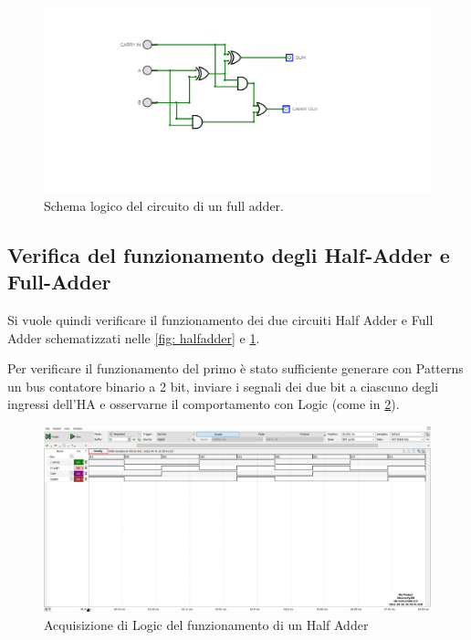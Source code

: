 \documentclass[10pt, a4paper, italian]{article}
\begin{document}
\begin{figure}[htbp]
    \centering
    \includegraphics[width=0.6\linewidth]{full}
    \caption{Schema logico del circuito di un full adder.
    \label{fig: fulladder}}
\end{figure}

\subsection{Verifica del funzionamento degli Half-Adder e Full-Adder}
Si vuole quindi verificare il funzionamento dei due circuiti Half Adder e
Full Adder schematizzati nelle \cref{fig: halfadder} e \cref{fig: fulladder}.

Per verificare il funzionamento del primo è stato sufficiente generare con
Patterns un bus contatore binario a 2 bit, inviare i segnali dei due bit a
ciascuno degli ingressi dell'HA e osservarne il comportamento con Logic
(come in \cref{fig: HA_log}).
\begin{figure}[htbp]
	\centering
	\includegraphics[width=\textwidth]{half_time}
	\caption{Acquisizione di Logic del funzionamento di un Half Adder
	\label{fig: HA_log}}
\end{figure}
\end{document}
